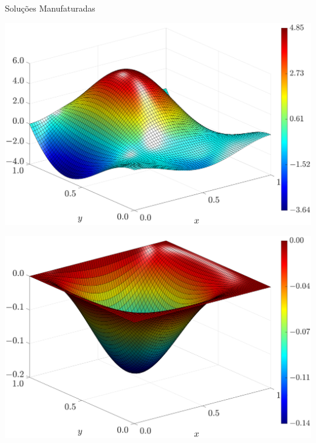 \begin{frame}{Soluções Manufaturadas}
    \centering
    \captionsetup{justification=centering}
    \label{fig:sol_manufaturadas_2}
    \begin{minipage}{0.48\textwidth}
        \centering
        \includegraphics[width=\textwidth]{Figures/Exact_Surf_NormErr_2nd_Betann_0.1_Re_1_Wi_1_epsilon_0_xi_0_alphaG_0_Dt_1e-06_at_0.05_tipsim_1_MMS_12_Wz.eps}
        \label{fig_solexawzCase1}
    \end{minipage}
    \hfill
    \begin{minipage}{0.48\textwidth}
        \centering
        \includegraphics[width=\textwidth]{Figures/Exact_Surf_NormErr_2nd_Betann_0.1_Re_1_Wi_1_epsilon_0_xi_0_alphaG_0_Dt_1e-06_at_0.05_tipsim_1_MMS_12_Psi.eps}
        \label{fig_solexapsiCase1}
    \end{minipage}
\end{frame}

